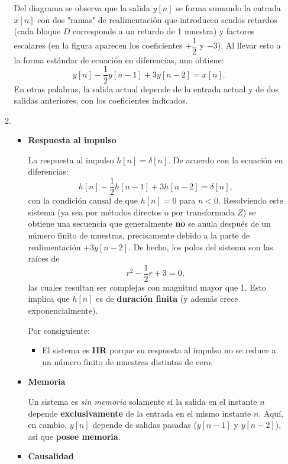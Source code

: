 \begin{enumerate}[label=\color{red}\textbf{\arabic*)}]
\begin{enumerate}[label=\color{red}\textbf{\alph*)}]
            Del diagrama se observa que la salida $y[n]$ se forma sumando la entrada  $x[n]$ con dos "ramas" de realimentación que introducen sendos retardos (cada bloque $D$ corresponde a un retardo de 1 muestra) y factores escalares (en la figura aparecen los coeficientes $+\dfrac{1}{2}$ y $-3$). Al llevar esto a la forma estándar de ecuación en diferencias, uno obtiene: \[
                \boxed{y[n]-\dfrac{1}{2}y[n-1]+3y[n-2]=x[n].}
            \] 
            En otras palabras, la salida actual depende de la entrada actual y de dos salidas anteriores, con los coeficientes indicados.
        \item {}
            \begin{itemize}[label=\textbullet]
                \item \textbf{Respuesta al impulso}

                    La respuesta al impulso $h[n]=\delta[n]$. De acuerdo con la ecuación en diferencias: \[
                        h[n]-\dfrac{1}{2}h[n-1]+3h[n-2]=\delta[n],
                    \] con la condición causal de que $h[n]=0$ para  $n<0$. Resolviendo este sistema (ya sea por métodos directos o por transformada $Z$) se obtiene una secuencia que generalmente \textbf{no} se anula después de un número finito de muestras, precisamente debido a la parte de realimentación $+3y[n-2]$. De hecho, los polos del sistema son las raíces de  \[
                    r^2-\dfrac{1}{2}r+3=0,
                \] las cuales resultan ser complejas con magnitud mayor que 1. Esto implica que $h[n]$ es de \textbf{duración finita} (y además crece exponencialmente). 
                    
                Por consiguiente:
                \begin{itemize}[label=\textbullet]
                    \item El sistema es \textbf{IIR} porque su respuesta al impulso no se reduce a un número finito de muestras distintas de cero. 
                \end{itemize}
            \item \textbf{Memoria}

                Un sistema es \textit{sin memoria} solamente si la salida en el instante $n$ depende \textbf{exclusivamente} de la entrada en el mismo instante $n$. Aquí, en cambio,  $y[n]$ depende de salidas pasadas ($y[n-1]$ y  $y[n-2]$), así que \textbf{posee memoria}.
            \item \textbf{Causalidad}


\end{itemize}
\end{enumerate}
\end{enumerate}
